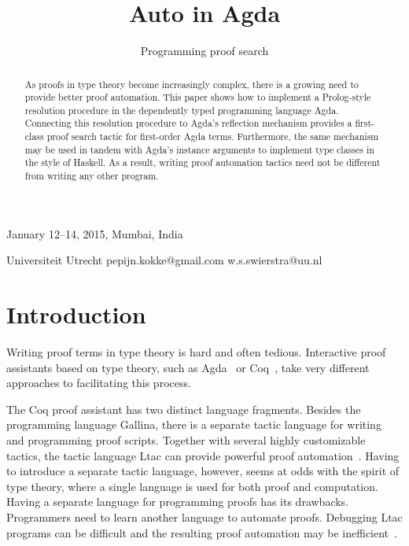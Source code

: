 \documentclass[preprint]{sigplanconf}
\begin{document}
 {January 12--14, 2015, Mumbai, India}

\title{Auto in Agda}
\subtitle{Programming proof search}

           {Universiteit Utrecht}
           {pepijn.kokke@gmail.com \quad w.s.swierstra@uu.nl}

\maketitle

\begin{abstract}

  As proofs in type theory become increasingly complex, there is a
  growing need to provide better proof automation. This paper shows
  how to implement a Prolog-style resolution procedure in the
  dependently typed programming language Agda. Connecting this
  resolution procedure to Agda's reflection mechanism provides a
  first-class proof search tactic for first-order Agda
  terms. Furthermore, the same mechanism may be used in tandem with
  Agda's instance arguments to implement type classes in the style of
  Haskell. As a result, writing proof automation tactics need not be
  different from writing any other program.

\end{abstract}

\section{Introduction}
\label{sec:intro}

Writing proof terms in type theory is hard and often tedious.
Interactive proof assistants based on type theory, such as
Agda~\cite{agda} or Coq~\cite{coq}, take very different approaches to
facilitating this process.

The Coq proof assistant has two distinct language fragments. Besides
the programming language Gallina, there is a separate tactic language
for writing and programming proof scripts. Together with several
highly customizable tactics, the tactic language Ltac can provide
powerful proof automation~\cite{chlipala}. Having to introduce a
separate tactic language, however, seems at odds with the spirit of
type theory, where a single language is used for both proof and
computation.  Having a separate language for programming proofs has
its drawbacks. Programmers need to learn another language to automate
proofs. Debugging Ltac programs can be difficult and the resulting
proof automation may be inefficient~\cite{brabaint}.
\end{document}
